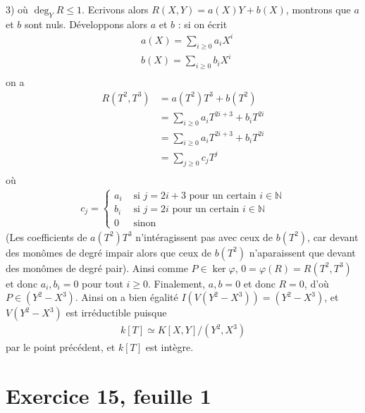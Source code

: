 \documentclass[11pt]{article}
\begin{document}
\begin{question}{3)}
        où $\deg_Y R \leq 1$. Ecrivons alors $R(X,Y) = a(X)Y + b(X)$, montrons que $a$ et $b$ sont nuls. Développons alors $a$ et $b$ : si on écrit 
        \begin{align*}
            &a(X) = \sum_{i \geq 0} a_i X^i \\
            &b(X) = \sum_{i \geq 0} b_i X^i \\
        \end{align*}
        on a 
        \begin{align*}
            R(T^2, T^3) &= a(T^2)T^3 + b(T^2) \\
            &= \sum_{i \geq 0} a_i T^{2i + 3} + b_i T^{2i} \\
            &= \sum_{i \geq 0} a_i T^{2i + 3} + b_i T^{2i} \\
            &= \sum_{j \geq 0} c_j T^j \\
        \end{align*}
        où
        \begin{align*}
            c_j =
            \begin{cases}
                a_i &\text{ si } j = 2i + 3 \text{ pour un certain } i \in \mathbb{N} \\
                b_i &\text{ si } j = 2i \text{ pour un certain } i \in \mathbb{N} \\
                0 & \text{ sinon}
            \end{cases}
        \end{align*}
        (Les coefficients de $a(T^2)T^3$ n'intéragissent pas avec ceux de $b(T^2)$, car devant des monômes de degré impair alors que ceux de $b(T^2)$ n'aparaissent que devant des monômes de degré pair). Ainsi comme $P \in \ker \varphi$, $0 = \varphi(R) = R(T^2, T^3)$ et donc $a_i, b_i = 0$ pour tout $i \geq 0$. Finalement, $a,b = 0$ et donc $R = 0$, d'où $P \in (Y^2 - X^3)$. Ainsi on a bien égalité $I(V(Y^2 - X^3)) = (Y^2 - X^3)$, et $V(Y^2 - X^3)$ est irréductible puisque
        \begin{align*}
            k[T] \simeq K[X,Y]/(Y^2 , X^3)
        \end{align*}
        par le point précédent, et $k[T]$ est intègre.
    \end{question}

\section*{Exercice 15, feuille 1}
\end{document}

